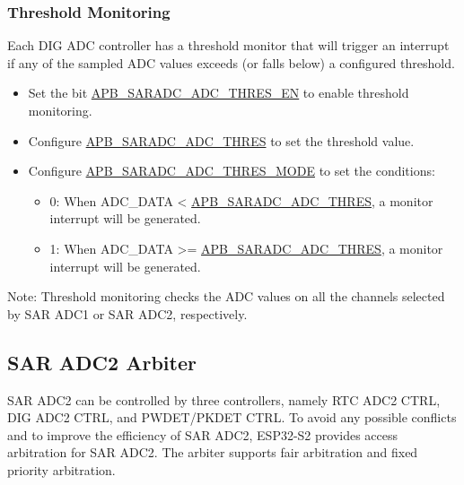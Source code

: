 \documentclass[main\_\_EN.tex]{subfiles}
\begin{document}
\subsubsection{Threshold Monitoring}

Each DIG ADC controller has a threshold monitor that will trigger an interrupt if any of the sampled ADC values exceeds (or falls below) a configured threshold.

\begin{itemize}
    \item Set the bit \hyperref[fielddesc:APBSARADCADC1THRESEN]{APB\_SARADC\_ADC\_THRES\_EN} to enable threshold monitoring.
    \item Configure \hyperref[fielddesc:APBSARADCADC1THRES]{APB\_SARADC\_ADC\_THRES} to set the threshold value.
    \item Configure \hyperref[fielddesc:APBSARADCADC1THRESMODE]{APB\_SARADC\_ADC\_THRES\_MODE} to set the conditions:
    \begin{itemize}
        \item 0: When ADC\_DATA < \hyperref[fielddesc:APBSARADCADC1THRES]{APB\_SARADC\_ADC\_THRES}, a monitor interrupt will be generated.
        \item 1: When ADC\_DATA >= \hyperref[fielddesc:APBSARADCADC1THRES]{APB\_SARADC\_ADC\_THRES}, a monitor interrupt will be generated.
    \end{itemize}
\end{itemize}

Note:
    Threshold monitoring checks the ADC values on all the channels selected by SAR ADC1 or SAR ADC2, respectively.

\subsection{SAR ADC2 Arbiter}

SAR ADC2 can be controlled by three controllers, namely RTC ADC2 CTRL, DIG ADC2 CTRL, and PWDET/PKDET CTRL. To avoid any possible conflicts and to improve the efficiency of SAR ADC2, ESP32-S2 provides access arbitration for SAR ADC2. The arbiter supports fair arbitration and fixed priority arbitration.
\end{document}
